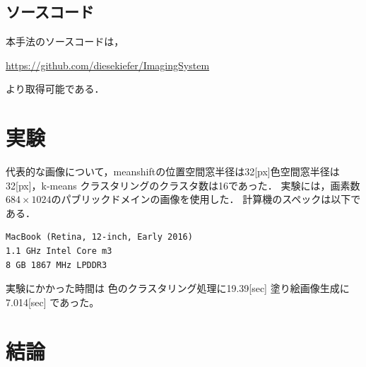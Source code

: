 \documentclass[dvipdfmx]{jsarticle}
\begin{document}



\subsection{ソースコード}

本手法のソースコードは，

\noindent\url{https://github.com/diesekiefer/ImagingSystem}

\noindent より取得可能である．


\section{実験}
代表的な画像について，meanshiftの位置空間窓半径は32[px]色空間窓半径は32[px]，k-means クラスタリングのクラスタ数は16であった．
実験には，画素数$684\times1024$のパブリックドメインの画像を使用した．
計算機のスペックは以下である．
\begin{verbatim}
MacBook (Retina, 12-inch, Early 2016)
1.1 GHz Intel Core m3
8 GB 1867 MHz LPDDR3
\end{verbatim}
実験にかかった時間は
色のクラスタリング処理に19.39[sec]
塗り絵画像生成に7.014[sec]
であった。

\section{結論}
\end{document}
